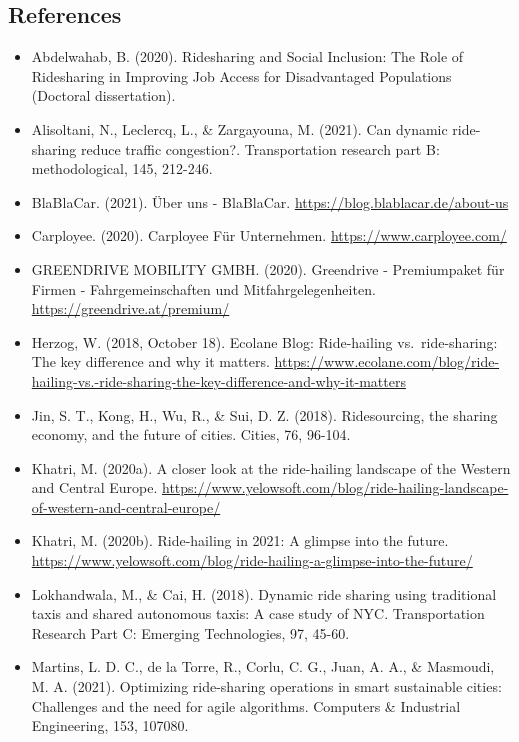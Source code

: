 \documentclass[
]{book}
\providecommand{\tightlist}{%
  \setlength{\itemsep}{0pt}\setlength{\parskip}{0pt}}
\begin{document}
\hypertarget{references-45}{%
\subsection*{References}\label{references-45}}

\begin{itemize}
\tightlist
\item
  Abdelwahab, B. (2020). Ridesharing and Social Inclusion: The Role of Ridesharing in Improving Job Access for Disadvantaged Populations (Doctoral dissertation).
\item
  Alisoltani, N., Leclercq, L., \& Zargayouna, M. (2021). Can dynamic ride-sharing reduce traffic congestion?. Transportation research part B: methodological, 145, 212-246.
\item
  BlaBlaCar. (2021). Über uns - BlaBlaCar. \url{https://blog.blablacar.de/about-us}
\item
  Carployee. (2020). Carployee \textbar{} Für Unternehmen. \url{https://www.carployee.com/}
\item
  GREENDRIVE MOBILITY GMBH. (2020). Greendrive - Premiumpaket für Firmen - Fahrgemeinschaften und Mitfahrgelegenheiten. \url{https://greendrive.at/premium/}
\item
  Herzog, W. (2018, October 18). Ecolane Blog: Ride-hailing vs.~ride-sharing: The key difference and why it matters. \url{https://www.ecolane.com/blog/ride-hailing-vs.-ride-sharing-the-key-difference-and-why-it-matters}
\item
  Jin, S. T., Kong, H., Wu, R., \& Sui, D. Z. (2018). Ridesourcing, the sharing economy, and the future of cities. Cities, 76, 96-104.
\item
  Khatri, M. (2020a). A closer look at the ride-hailing landscape of the Western and Central Europe. \url{https://www.yelowsoft.com/blog/ride-hailing-landscape-of-western-and-central-europe/}
\item
  Khatri, M. (2020b). Ride-hailing in 2021: A glimpse into the future. \url{https://www.yelowsoft.com/blog/ride-hailing-a-glimpse-into-the-future/}
\item
  Lokhandwala, M., \& Cai, H. (2018). Dynamic ride sharing using traditional taxis and shared autonomous taxis: A case study of NYC. Transportation Research Part C: Emerging Technologies, 97, 45-60.
\item
  Martins, L. D. C., de la Torre, R., Corlu, C. G., Juan, A. A., \& Masmoudi, M. A. (2021). Optimizing ride-sharing operations in smart sustainable cities: Challenges and the need for agile algorithms. Computers \& Industrial Engineering, 153, 107080.

\end{itemize}
\end{document}
